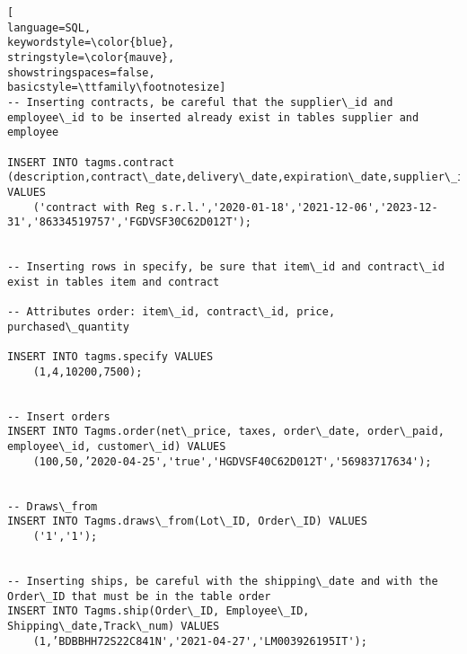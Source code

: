 \begin{lstlisting}[
language=SQL,
keywordstyle=\color{blue},
stringstyle=\color{mauve},
showstringspaces=false,
basicstyle=\ttfamily\footnotesize]
-- Inserting contracts, be careful that the supplier\_id and employee\_id to be inserted already exist in tables supplier and employee

INSERT INTO tagms.contract (description,contract\_date,delivery\_date,expiration\_date,supplier\_id,employee\_id) VALUES
    ('contract with Reg s.r.l.','2020-01-18','2021-12-06','2023-12-31','86334519757','FGDVSF30C62D012T');


-- Inserting rows in specify, be sure that item\_id and contract\_id exist in tables item and contract

-- Attributes order: item\_id, contract\_id, price, purchased\_quantity

INSERT INTO tagms.specify VALUES
    (1,4,10200,7500);


-- Insert orders
INSERT INTO Tagms.order(net\_price, taxes, order\_date, order\_paid, employee\_id, customer\_id) VALUES
    (100,50,’2020-04-25','true','HGDVSF40C62D012T','56983717634');


-- Draws\_from
INSERT INTO Tagms.draws\_from(Lot\_ID, Order\_ID) VALUES
    ('1','1');


-- Inserting ships, be careful with the shipping\_date and with the Order\_ID that must be in the table order
INSERT INTO Tagms.ship(Order\_ID, Employee\_ID, Shipping\_date,Track\_num) VALUES
    (1,’BDBBHH72S22C841N','2021-04-27','LM003926195IT');

\end{lstlisting}